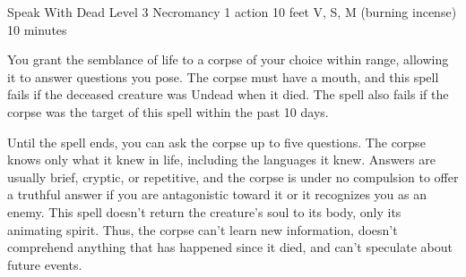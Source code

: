 \DndSpellHeader%
    {Speak With Dead}
    {Level 3 Necromancy}
    {1 action}
    {10 feet}
    {V, S, M (burning incense)}
    {10 minutes}

You grant the semblance of life to a corpse of your choice within range, allowing it to answer questions you pose. The corpse must have a mouth, and this spell fails if the deceased creature was Undead when it died. The spell also fails if the corpse was the target of this spell within the past 10 days.

Until the spell ends, you can ask the corpse up to five questions. The corpse knows only what it knew in life, including the languages it knew. Answers are usually brief, cryptic, or repetitive, and the corpse is under no compulsion to offer a truthful answer if you are antagonistic toward it or it recognizes you as an enemy. This spell doesn't return the creature's soul to its body, only its animating spirit. Thus, the corpse can't learn new information, doesn't comprehend anything that has happened since it died, and can't speculate about future events.
